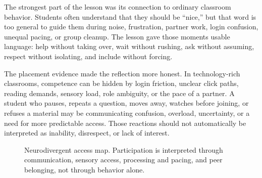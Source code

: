 \newpage
{}

The strongest part of the lesson was its connection to ordinary classroom behavior. Students often understand that they should be ``nice,'' but that word is too general to guide them during noise, frustration, partner work, login confusion, unequal pacing, or group cleanup. The lesson gave those moments usable language: help without taking over, wait without rushing, ask without assuming, respect without isolating, and include without forcing.

The placement evidence made the reflection more honest. In technology-rich classrooms, competence can be hidden by login friction, unclear click paths, reading demands, sensory load, role ambiguity, or the pace of a partner. A student who pauses, repeats a question, moves away, watches before joining, or refuses a material may be communicating confusion, overload, uncertainty, or a need for more predictable access. Those reactions should not automatically be interpreted as inability, disrespect, or lack of interest.

\begin{figure}[htbp]
\centering
{}
\caption{Neurodivergent access map. Participation is interpreted through communication, sensory access, processing and pacing, and peer belonging, not through behavior alone.}
\label{fig:access-map}
\end{figure}

